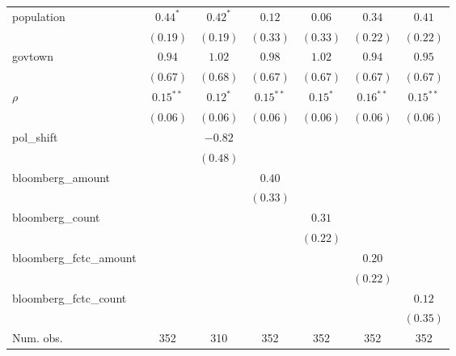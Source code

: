 \begin{table}[!h]
\begin{center}
\begin{tabular}{l c c c c c c }
population              & $0.44^{*}$   & $0.42^{*}$   & $0.12$       & $0.06$       & $0.34$       & $0.41$       \\
                        & $(0.19)$     & $(0.19)$     & $(0.33)$     & $(0.33)$     & $(0.22)$     & $(0.22)$     \\
govtown                 & $0.94$       & $1.02$       & $0.98$       & $1.02$       & $0.94$       & $0.95$       \\
                        & $(0.67)$     & $(0.68)$     & $(0.67)$     & $(0.67)$     & $(0.67)$     & $(0.67)$     \\
$\rho$                  & $0.15^{**}$  & $0.12^{*}$   & $0.15^{**}$  & $0.15^{*}$   & $0.16^{**}$  & $0.15^{**}$  \\
                        & $(0.06)$     & $(0.06)$     & $(0.06)$     & $(0.06)$     & $(0.06)$     & $(0.06)$     \\
pol\_shift              &              & $-0.82$      &              &              &              &              \\
                        &              & $(0.48)$     &              &              &              &              \\
bloomberg\_amount       &              &              & $0.40$       &              &              &              \\
                        &              &              & $(0.33)$     &              &              &              \\
bloomberg\_count        &              &              &              & $0.31$       &              &              \\
                        &              &              &              & $(0.22)$     &              &              \\
bloomberg\_fctc\_amount &              &              &              &              & $0.20$       &              \\
                        &              &              &              &              & $(0.22)$     &              \\
bloomberg\_fctc\_count  &              &              &              &              &              & $0.12$       \\
                        &              &              &              &              &              & $(0.35)$     \\
\midrule
Num. obs.               & 352          & 310          & 352          & 352          & 352          & 352          \\

\end{tabular}
\end{center}
\end{table}
